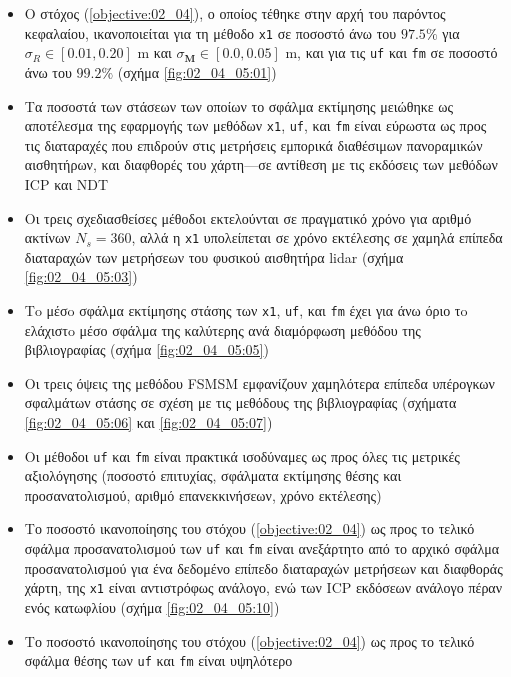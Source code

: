 \begin{itemize}
  \item Ο στόχος (\ref{objective:02_04}), ο οποίος τέθηκε στην αρχή του παρόντος
        κεφαλαίου, ικανοποιείται για τη μέθοδο \texttt{x1} σε ποσοστό άνω του
        $97.5\%$ για $\sigma_R \in [0.01, 0.20]$ m και
        $\sigma_{\bm{M}} \in [0.0, 0.05]$ m, και για τις \texttt{uf} και
        \texttt{fm} σε ποσοστό άνω του $99.2\%$ (σχήμα \ref{fig:02_04_05:01})
  \item Τα ποσοστά των στάσεων των οποίων το σφάλμα εκτίμησης μειώθηκε ως
        αποτέλεσμα της εφαρμογής των μεθόδων \texttt{x1}, \texttt{uf}, και
        \texttt{fm} είναι εύρωστα ως προς τις διαταραχές που επιδρούν στις
        μετρήσεις εμπορικά διαθέσιμων πανοραμικών αισθητήρων, και διαφθορές του
        χάρτη---σε αντίθεση με τις εκδόσεις των μεθόδων ICP και NDT
  \item Οι τρεις σχεδιασθείσες μέθοδοι εκτελούνται σε πραγματικό χρόνο για
        αριθμό ακτίνων $N_s = 360$, αλλά η \texttt{x1} υπολείπεται σε χρόνο
        εκτέλεσης σε χαμηλά επίπεδα διαταραχών των μετρήσεων του φυσικού
        αισθητήρα lidar (σχήμα \ref{fig:02_04_05:03})
  \item Τo μέσo σφάλμα εκτίμησης στάσης των \texttt{x1}, \texttt{uf}, και
        \texttt{fm} έχει για άνω όριο τo ελάχιστo μέσο σφάλμα της καλύτερης
        ανά διαμόρφωση μεθόδου της βιβλιογραφίας (σχήμα \ref{fig:02_04_05:05})
  \item Οι τρεις όψεις της μεθόδου FSMSM εμφανίζουν χαμηλότερα επίπεδα
        υπέρογκων σφαλμάτων στάσης σε σχέση με τις μεθόδους της βιβλιογραφίας
        (σχήματα \ref{fig:02_04_05:06} και \ref{fig:02_04_05:07})
  \item Οι μέθοδοι \texttt{uf} και \texttt{fm} είναι πρακτικά ισοδύναμες ως προς
        όλες τις μετρικές αξιολόγησης (ποσοστό επιτυχίας, σφάλματα εκτίμησης
        θέσης και προσανατολισμού, αριθμό επανεκκινήσεων, χρόνο εκτέλεσης)
  \item Το ποσοστό ικανοποίησης του στόχου (\ref{objective:02_04}) ως προς
        το τελικό σφάλμα προσανατολισμού των \texttt{uf} και \texttt{fm} είναι
        ανεξάρτητο από το αρχικό σφάλμα προσανατολισμού για ένα δεδομένο επίπεδο
        διαταραχών μετρήσεων και διαφθοράς χάρτη, της \texttt{x1} είναι
        αντιστρόφως ανάλογο, ενώ των ICP εκδόσεων ανάλογο πέραν ενός κατωφλίου
        (σχήμα \ref{fig:02_04_05:10})
  \item Το ποσοστό ικανοποίησης του στόχου (\ref{objective:02_04}) ως προς το
        τελικό σφάλμα θέσης των \texttt{uf} και \texttt{fm} είναι υψηλότερο

\end{itemize}
